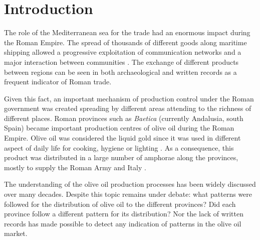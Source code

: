 \documentclass[review]{elsarticle}
\newcommand{\memo}[2]{\textcolor{#1}{#2}}
\newcommand{\xavi}[1]{\memo{magenta}{XRC: #1\\}}
\begin{document}
\section{Introduction}


The role of the Mediterranean sea for the trade had an enormous impact during the Roman Empire. The spread of thousands of different goods along maritime shipping allowed a progressive exploitation of communication networks and a major interaction between communities \citep{rodriguez_baetican_1998, 
temin_market_2001,
bevan_mediterranean_2014}. The exchange of different products between regions can be seen in both archaeological and written records as a frequent indicator of Roman trade.  


Given this fact, an important mechanism of production control under the Roman government was created spreading by different areas attending to the richness of different places. Roman provinces such as \textit{Baetica} (currently Andalusia, south Spain) became important production centres of olive oil during the Roman Empire. Olive oil was considered the liquid gold since it was used in different aspect of daily life for cooking, hygiene or lighting  \citep{mattingly_d.j._oil_1988}. As a consequence, this product was distributed in a large number of amphorae along the provinces, mostly to supply the Roman Army and Italy \citep{blazquez_exportacion_1980}. 


The understanding of the olive oil production processes has been widely discussed over many decades\citep{rodriguez_economioleicola_1977, Chic_hispania_1997,millet_anforas_1998}. Despite this topic remains under debate: what patterns were followed for the distribution of olive oil to the different provinces?
Did each province follow a different pattern for its distribution? Nor the lack of written records has made possible to detect any indication of patterns in the olive oil market.
\end{document}
